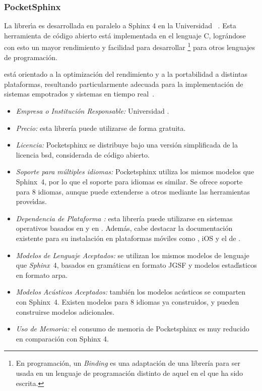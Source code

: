\subsubsection{PocketSphinx}
\label{sec:pocketsphinx}

La librer{\'\i}a  es desarrollada en paralelo a Sphinx 4 en la Universidad
\mbox{ \cite{PocketSphinxHomePage}}. Esta herramienta de c\'odigo abierto
est\'a implementada en el lenguaje C, logr\'andose con esto un mayor rendimiento y facilidad
para desarrollar \footnote{En programaci\'on, un \emph{Binding} es una adaptaci\'on de una librer\'ia para ser usada en un 
lenguaje de programaci\'on distinto de aquel en el que ha sido escrita.} 
para otros lenguajes de programaci\'on.

 est\'a orientado a la optimizaci\'on del rendimiento y a la portabilidad a distintas
plataformas, resultando particularmente adecuada para la implementaci\'on de sistemas empotrados
y sistemas en tiempo \mbox{real \cite{HugginsDainesPocketSphinx2006}}.

\begin{itemize}
	\item \emph{Empresa o Instituci\'on Responsable:} Universidad .
	\item \emph{Precio:} esta librer\'ia puede utilizarse de forma gratuita.
	\item \emph{Licencia:} Pocketsphinx  se distribuye bajo una versi\'on simplificada de la licencia
	\gls{bsd}, considerada de c\'odigo abierto.
	\item \emph{Soporte para m\'ultiples idiomas:} Pocketsphinx utiliza los mismos modelos
	que \mbox{Sphinx 4}, por lo que el soporte para idiomas es similar. Se ofrece soporte para 8
	idiomas, aunque puede extenderse a otros mediante las herramientas prove{\'\i}das.
	\item \emph{Dependencia de Plataforma :} esta librer\'ia puede utilizarse en sistemas operativos
	basados en  y en . 
	Adem\'as, cabe destacar la documentaci\'on existente para su 
	instalaci\'on en plataformas m\'oviles como , iOS y el  de 
	.
	\item \emph{Modelos de Lenguaje Aceptados:} se utilizan los mismos modelos de lenguaje que \mbox{\emph{Sphinx} 4},
	basados en gram\'aticas en formato JGSF y modelos estad{\'\i}sticos en \mbox{formato} \gls{arpa}.
	\item \emph{Modelos Ac\'usticos Aceptados:} tambi\'en los modelos ac\'usticos se comparten con \mbox{Sphinx 4}.
	Existen modelos para 8 idiomas ya construidos, y pueden construirse modelos adicionales.
	\item \emph{Uso de Memoria:} el consumo de memoria de Pocketsphinx es muy reducido en comparaci\'on con
        Sphinx 4\cite{SphinxVersions}.
\end{itemize}